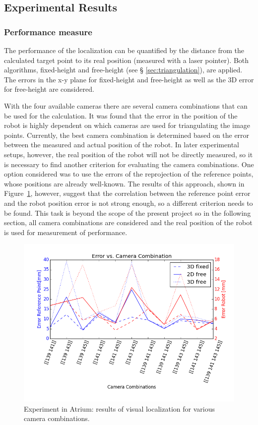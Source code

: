 \subsection{Experimental Results}

\subsubsection{Performance measure}
The performance of the localization can be quantified by the distance from the calculated target point to its real position (measured with a laser pointer). 
Both algorithms, fixed-height and free-height (see § \ref{sec:triangulation}), are applied. The errors in the x-y plane for fixed-height and free-height as well as the 3D error for free-height are considered. 

With the four available cameras there are several camera combinations that can be used for the calculation.
It was found that the error in the position of the robot is highly dependent on which cameras are used for triangulating the image points. 
Currently, the best camera combination is determined based on the error between the measured and actual position of the robot.
In later experimental setups, however, the real position of the robot will not be directly measured, so it is necessary to find another criterion for evaluating the camera combinations.
One option considered was to use the errors of the reprojection of the reference points, whose positions are already well-known.
The results of this approach, shown in Figure~\ref{fig:res0_err}, however, suggest that the correlation between the reference point error and the robot position error is not strong enough, so a different criterion needs to be found.
This task is beyond the scope of the present project so in the following section, all camera combinations are considered and the real position of the robot is used for measurement of performance.


\begin{figure}
    \centering
    \includegraphics[width=.8\linewidth]{files/res0_combi_4.png}
    \caption{Experiment in Atrium: results of visual localization for various camera combinations.}
    \label{fig:res0_err}
\end{figure}

